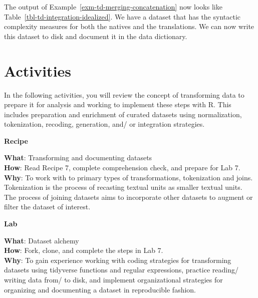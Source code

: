 \documentclass[
  letterpaper,
]{latex/krantz}
\theoremstyle{definition}
\theoremstyle{remark}
\begin{document}
The output of Example~\ref{exm-td-merging-concatenation} now looks like
Table~\ref{tbl-td-integration-idealized}. We have a dataset that has the
syntactic complexity measures for both the natives and the translations.
We can now write this dataset to disk and document it in the data
dictionary.

\section*{Activities}\label{activities-5}


In the following activities, you will review the concept of transforming
data to prepare it for analysis and working to implement these steps
with R. This includes preparation and enrichment of curated datasets
using normalization, tokenization, recoding, generation, and/ or
integration strategies.

\begin{tcolorbox}[enhanced jigsaw, colframe=quarto-callout-color-frame, breakable, bottomrule=.15mm, arc=.35mm, left=2mm, opacityback=0, rightrule=.15mm, colback=white, toprule=.15mm, leftrule=.75mm]

\textbf{ Recipe}

\textbf{What}: Transforming and documenting datasets\\
\textbf{How}: Read Recipe 7, complete comprehension check, and prepare
for Lab 7.\\
\textbf{Why}: To work with to primary types of transformations,
tokenization and joins. Tokenization is the process of recasting textual
units as smaller textual units. The process of joining datasets aims to
incorporate other datasets to augment or filter the dataset of interest.

\end{tcolorbox}

\begin{tcolorbox}[enhanced jigsaw, colframe=quarto-callout-color-frame, breakable, bottomrule=.15mm, arc=.35mm, left=2mm, opacityback=0, rightrule=.15mm, colback=white, toprule=.15mm, leftrule=.75mm]

\textbf{ Lab}

\textbf{What}: Dataset alchemy\\
\textbf{How}: Fork, clone, and complete the steps in Lab 7.\\
\textbf{Why}: To gain experience working with coding strategies for
transforming datasets using tidyverse functions and regular expressions,
practice reading/ writing data from/ to disk, and implement
organizational strategies for organizing and documenting a dataset in
reproducible fashion.

\end{tcolorbox}
\end{document}
